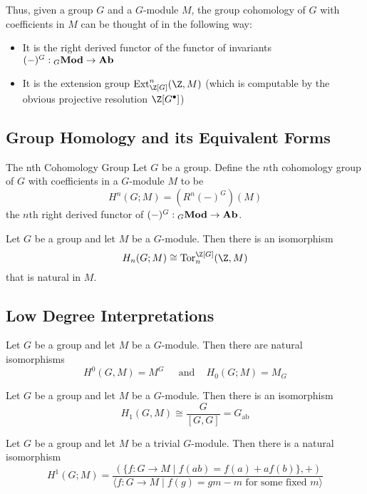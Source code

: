\documentclass[a4paper]{article}
\begin{document}
Thus, given a group $G$ and a $G$-module $M$, the group cohomology of $G$ with coefficients in $M$ can be thought of in the following way: 
\begin{itemize}
\item It is the right derived functor of the functor of invariants $(-)^G:{_G\bold{Mod}}\to\bold{Ab}$
\item It is the extension group $\text{Ext}_{\Z[G]}^n(\Z,M)$ (which is computable by the obvious projective resolution $\Z[G^\bullet]$)
\end{itemize}

\subsection{Group Homology and its Equivalent Forms}
\begin{defn}{The nth Cohomology Group}{} Let $G$ be a group. Define the $n$th cohomology group of $G$ with coefficients in a $G$-module $M$ to be $$H^n(G;M)=(R^n(-)^G)(M)$$ the $n$th right derived functor of $(-)^G:{_G\bold{Mod}}\to\bold{Ab}$. 
\end{defn}

\begin{thm}{}{} Let $G$ be a group and let $M$ be a $G$-module. Then there is an isomorphism $$H_n(G;M)\cong\text{Tor}_n^{\Z[G]}(\Z,M)$$ that is natural in $M$. 
\end{thm}

\subsection{Low Degree Interpretations}
\begin{thm}{}{} Let $G$ be a group and let $M$ be a $G$-module. Then there are natural isomorphisms $$H^0(G,M)=M^G\;\;\;\;\text{ and }\;\;\;H_0(G;M)=M_G$$
\end{thm}

\begin{thm}{}{} Let $G$ be a group and let $M$ be a $G$-module. Then there is an isomorphism $$H_1(G,M)\cong\frac{G}{[G,G]}=G_\text{ab}$$
\end{thm}

\begin{thm}{}{} Let $G$ be a group and let $M$ be a trivial $G$-module. Then there is a natural isomorphism $$H^1(G;M)=\frac{(\{f:G\to M\;|\;f(ab)=f(a)+af(b)\},+)}{\langle f:G\to M\;|\;f(g)=gm-m\text{ for some fixed }m\rangle}$$
\end{thm}
\end{document}
